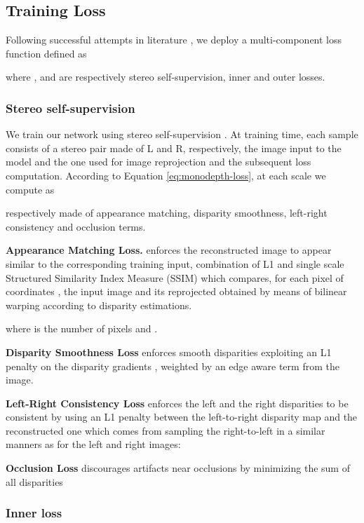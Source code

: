 \documentclass[10pt,twocolumn,letterpaper]{article}
\begin{document}
\subsection{Training Loss}

Following successful attempts in literature \cite{Godard1,pydnet18,Tosi_2019_CVPR}, we deploy a multi-component loss function defined as 


where ,  and  are respectively stereo self-supervision, inner and outer losses.

\subsubsection{Stereo self-supervision}

We train our network using stereo self-supervision \cite{Garg}. At training time, each sample consists of a stereo pair made of L and R, respectively, the image input to the model and the one used for image reprojection and the subsequent loss computation. According to Equation \ref{eq:monodepth-loss}, at each scale we compute  as


respectively made of appearance matching, disparity smoothness, left-right consistency and occlusion terms.

\textbf{Appearance Matching Loss.}
enforces the reconstructed image to appear similar to the corresponding training input, combination of L1 and single scale Structured Similarity Index Measure (SSIM) \cite{wang2004image} which compares, for each pixel of coordinates , the input image  and its reprojected  obtained by means of bilinear warping according to disparity estimations.


where  is the number of pixels and .

\textbf{Disparity Smoothness Loss}
enforces smooth disparities exploiting an L1 penalty on the disparity gradients , weighted by an edge aware term from the image.



\textbf{Left-Right Consistency Loss}
enforces the left and the right disparities to be consistent by using an L1 penalty between the left-to-right disparity map and the reconstructed one which comes from sampling the right-to-left in a similar manners as for the left and right images:
 

\textbf{Occlusion Loss}
discourages artifacts near occlusions \cite{yang2018deep} by minimizing the sum of all disparities



\subsubsection{Inner loss}
\end{document}
